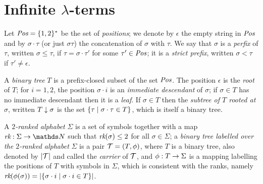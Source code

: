 \section{Infinite $\lambda$-terms}\label{sec:infinite-terms}

Let $\textit{Pos} = \{ 1, 2 \}^*$ be the set of {\em positions}; 
we denote by $\epsilon$ the empty string in $\textit{Pos}$ 
and by $\sigma\cdot\tau$ (or just $\sigma\tau$) the concatenation of $\sigma$ with
$\tau$. We say that $\sigma$ is a {\em perfix} of $\tau$,
written $\sigma \leq \tau$, if $\tau = \sigma\cdot \tau'$ for some 
$\tau' \in \textit{Pos}$; it is a {\em strict prefix}, written $\sigma < \tau$
if $\tau' \neq \epsilon$.

A {\em binary tree} $T$ is a prefix-closed subset of the set
$\textit{Pos}$. The position $\epsilon$ is the {\em root} of $T$; 
for $i = 1,2$, the position $\sigma \cdot i$ is an {\em immediate descendant} of $\sigma$;
if $\sigma \in T$ has no immediate descendant then it is a {\em leaf}. 
If $\sigma \in T$ then the {\em subtree of $T$ rooted at $\sigma$}, written 
$T \downarrow \sigma$ is the set $\{ \tau \mid \sigma \cdot \tau \in T \}$, which is
itself a binary tree.

A {\em $2$-ranked alphabet}
$\Sigma$ is a set of symbols together with a map $\rank:\Sigma \to \nat$
such that $\textit{rk}(\sigma) \leq 2$ for all $\sigma \in \Sigma$; a {\em binary tree labelled over
the $2$-ranked alphabet} $\Sigma$ is a pair $\BTree = (T, \phi)$, where $T$ is a binary tree, 
also denoted by $|\BTree|$  and called the {\em carrier} of $\BTree$, and
$\phi : T \to \Sigma$ is a mapping labelling the positions of $T$ with symbols in $\Sigma$, 
which is consistent with the ranks,
namely $\textit{rk}(\phi(\sigma)) = |\{ \sigma\cdot i \mid \sigma\cdot i \in T \}|$.

